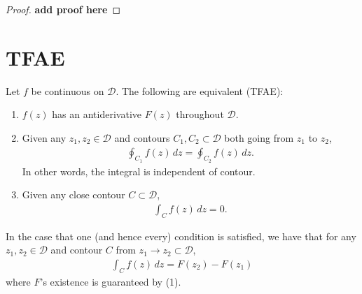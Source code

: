 \documentclass{article}
\theoremstyle{definition}
\begin{document}
\begin{proof}
	\textbf{add proof here}
\end{proof}




\section{TFAE}

Let $f$ be continuous on $\mathcal{D}$. The following are equivalent (TFAE):

\begin{enumerate}
	\item $f(z)$ has an antiderivative $F(z)$ throughout $\mathcal{D}$.
	
	\item Given any $z_1, z_2 \in \mathcal{D}$ and contours $C_1, C_2 \subset \mathcal{D}$ both going from $z_1$ to $z_2$,
	\begin{align}
	\oint_{C_1}f(z)\,dz = \oint_{C_2}f(z)\,dz.
	\end{align}
	In other words, the integral is independent of contour. 
	
	\item Given any close contour $C \subset \mathcal{D}$, 
	\begin{align}
	\int_{C} f(z)\,dz = 0.
	\end{align}
\end{enumerate}

In the case that one (and hence every) condition is satisfied, we have that for any $z_1, z_2 \in \mathcal{D}$ and contour $C$ from $z_1 \to z_2 \subset \mathcal{D}$, 
\begin{align}
\int_C f(z)\,dz = F(z_2) - F(z_1)
\end{align}
where $F$'s existence is guaranteed by (1).
\end{document}
